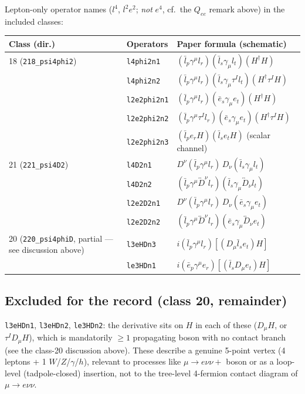 \documentclass[11pt,a4paper]{article}
\newcommand{\Q}[1]{Q_{#1}}
\begin{document}
Lepton-only operator names ($l^4$, $l^2e^2$; \emph{not} $e^4$, cf.\ the
$\Q{ee}$ remark above) in the included classes:

\begin{center}
\begin{tabular}{@{}lll@{}}
\toprule
Class (dir.) & Operators & Paper formula (schematic) \\
\midrule
18 (\texttt{218\_psi4phi2})
  & \texttt{l4phi2n1} & $(\bar l_p\gamma^\mu l_r)(\bar l_s\gamma_\mu l_t)(H^\dagger H)$ \\
  & \texttt{l4phi2n2} & $(\bar l_p\gamma^\mu l_r)(\bar l_s\gamma_\mu\tau^I l_t)(H^\dagger\tau^I H)$ \\
  & \texttt{l2e2phi2n1} & $(\bar l_p\gamma^\mu l_r)(\bar e_s\gamma_\mu e_t)(H^\dagger H)$ \\
  & \texttt{l2e2phi2n2} & $(\bar l_p\gamma^\mu\tau^I l_r)(\bar e_s\gamma_\mu e_t)(H^\dagger\tau^I H)$ \\
  & \texttt{l2e2phi2n3} & $(\bar l_p e_r H)(\bar l_s e_t H)$ \quad(scalar channel) \\
\midrule
21 (\texttt{221\_psi4D2})
  & \texttt{l4D2n1} & $D^\nu(\bar l_p\gamma^\mu l_r)\,D_\nu(\bar l_s\gamma_\mu l_t)$ \\
  & \texttt{l4D2n2} & $(\bar l_p\gamma^\mu\overleftrightarrow D^\nu l_r)(\bar l_s\gamma_\mu\overleftrightarrow D_\nu l_t)$ \\
  & \texttt{l2e2D2n1} & $D^\nu(\bar l_p\gamma^\mu l_r)\,D_\nu(\bar e_s\gamma_\mu e_t)$ \\
  & \texttt{l2e2D2n2} & $(\bar l_p\gamma^\mu\overleftrightarrow D^\nu l_r)(\bar e_s\gamma_\mu\overleftrightarrow D_\nu e_t)$ \\
\midrule
20 (\texttt{220\_psi4phiD}, partial ---see discussion above)
  & \texttt{l3eHDn3} & $i(\bar l_p\gamma^\mu l_r)[(D_\mu\bar l_s e_t)H]$ \\
  & \texttt{le3HDn1} & $i(\bar e_p\gamma^\mu e_r)[(\bar l_s D_\mu e_t)H]$ \\
\bottomrule
\end{tabular}
\end{center}

\subsection*{Excluded for the record (class 20, remainder)}
\texttt{l3eHDn1}, \texttt{l3eHDn2}, \texttt{le3HDn2}: the derivative sits
on $H$ in each of these ($D_\mu H$, or $\tau^I D_\mu H$), which is
mandatorily $\geq 1$ propagating boson with no contact branch (see the
class-20 discussion above). These describe a genuine 5-point vertex
(4 leptons + 1 $W$/$Z$/$\gamma$/$h$), relevant to processes like $\mu\to
e\nu\nu +$ boson or as a loop-level (tadpole-closed) insertion, not to the
tree-level 4-fermion contact diagram of $\mu\to e\nu\nu$.
\end{document}
